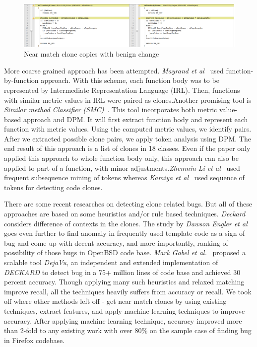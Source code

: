 \documentclass[nocopyrightspace]{sigplanconf}
\begin{document}
\begin{figure}[t!]
\centering
\includegraphics[width=\textwidth]{Benigncase.png}
\caption{Near match clone copies with benign change}
\label{fig:benign}
\end{figure}

\vspace{10 pt}
\noindent
More coarse grained approach has been attempted. \emph{Mayrand et al}~\cite{Mayrand1996} used function-by-function approach. With this scheme, each function body was to be represented by Intermediate Representation Language (IRL). Then, functions with similar metric values in IRL were paired as clones.Another promising tool is \emph{Similar method Classifier (SMC)}~\cite{Balazinska1999}. This tool incorporates both metric value-based approach and DPM. It will first extract function body and represent each function with metric values. Using the computed metric values, we identify pairs. After we extracted possible clone pairs, we apply token analysis using DPM. The end result of this approach is a list of clones in 18 classes. Even if the paper only applied this approach to whole function body only, this approach can also be applied to part of a function, with minor adjustments.\emph{Zhenmin Li et al}~\citep{Li2006} used frequent subsequence mining of tokens whereas \emph{Kamiya et al}~\cite{Kamiya2002} used sequence of tokens for detecting code clones. 

\vspace{10 pt}
\noindent
There are some recent researches on detecting clone related bugs. But all of these approaches are based on some heuristics and/or rule based techniques. \emph{Deckard}~\cite{Jiang2007} considers difference of contexts in the clones. The study by \emph{Dawson Engler et al}~\cite{Engler2001} goes even further to find anomaly in frequently used template code as a sign of bug and come up with decent accuracy, and more importantly, ranking of possibility of those bugs in OpenBSD code base. \emph{Mark Gabel et al.}~\cite{Gabel2010} proposed a scalable tool \emph{DejaVu}, an independent and extended implementation of \emph{DECKARD} to detect bug in a 75+ million lines of code base and achieved 30 percent accuracy. Though applying many such heuristics and relaxed matching improve recall, all the techniques heavily suffers from accuracy or recall. We took off where other methods left off - get near match clones by using existing techniques, extract features, and apply machine learning techniques to improve accuracy. After applying machine learning technique, accuracy improved more than 2-fold to any existing work with over $80\%$ on the sample case of finding bug in Firefox codebase.
\end{document}
